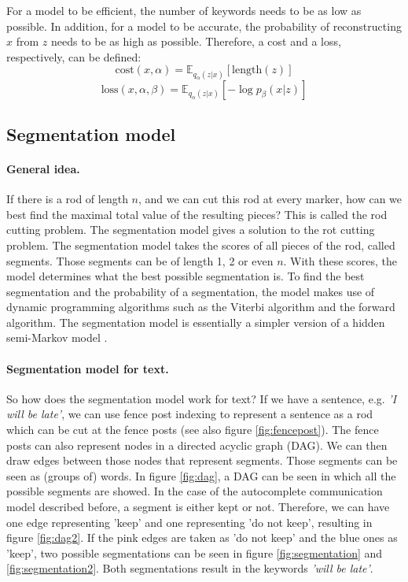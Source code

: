 For a model to be efficient, the number of keywords needs to be as low as possible. 
In addition, for a model to be accurate, the probability of reconstructing $x$ from $z$ needs to be as high as possible. 
Therefore, a cost and a loss, respectively, can be defined:
\begin{equation}
    \label{eq:cost}
    \text{cost}(x,\alpha) = \mathbb{E}_{q_{\alpha}(z|x)} [\text{length}(z)]
\end{equation}
\begin{equation}
    \label{eq:loss}
    \text{loss}(x,\alpha,\beta) = \mathbb{E}_{q_{\alpha}(z|x)} [-\log p_{\beta}(x|z)]
\end{equation}

\subsection{Segmentation model}
\label{sec:segmentation}

\paragraph{General idea.}
If there is a rod of length $n$, and we can cut this rod at every marker, how can we best find the maximal total value of the resulting pieces?
This is called the rod cutting problem.
The segmentation model gives a solution to the rot cutting problem. 
The segmentation model takes the scores of all pieces of the rod, called segments. 
Those segments can be of length 1, 2 or even $n$. 
With these scores, the model determines what the best possible segmentation is. 
To find the best segmentation and the probability of a segmentation, the model makes use of dynamic programming algorithms such as the Viterbi algorithm  and the forward algorithm.
The segmentation model is essentially a simpler version of a hidden semi-Markov model . 

\paragraph{Segmentation model for text.}
So how does the segmentation model work for text? 
If we have a sentence, e.g. \textit{'I will be late'}, we can use fence post indexing to represent a sentence as a rod which can be cut at the fence posts (see also figure \ref{fig:fencepost}).
The fence posts can also represent nodes in a directed acyclic graph (DAG). 
We can then draw edges between those nodes that represent segments. 
Those segments can be seen as (groups of) words. 
In figure \ref{fig:dag}, a DAG can be seen in which all the possible segments are showed. 
In the case of the autocomplete communication model described before, a segment is either kept or not.
Therefore, we can have one edge representing 'keep' and one representing 'do not keep', resulting in figure \ref{fig:dag2}.
If the pink edges are taken as 'do not keep' and the blue ones as 'keep', two possible segmentations can be seen in figure \ref{fig:segmentation} and \ref{fig:segmentation2}. 
Both segmentations result in the keywords \textit{'will be late'}. 

